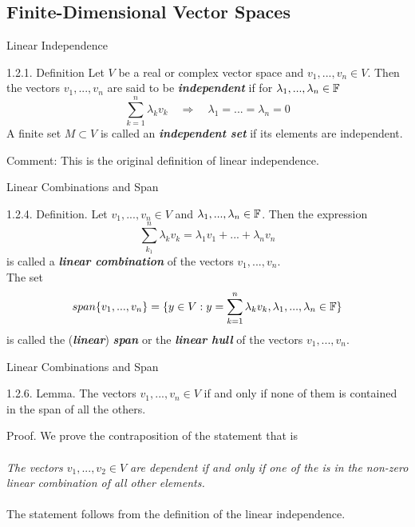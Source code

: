 \documentclass[hyperref={pdfpagelabels=true}]{beamer}
\newcommand{\highlightg}[1]{\textcolor[rgb]{0.1,0.5,0.3}{\emph{\textbf{#1}}}}
\newcommand{\<}{\langle}
\renewcommand{\>}{\rangle}
\begin{document}
\subsection{Finite-Dimensional Vector Spaces}
\begin{frame}{Linear Independence}
    \begin{block}{1.2.1. Definition}
        Let $V$ be a real or complex vector space and $v_1,...,v_n \in V$. Then the vectors $v_1,...,v_n$ are said to be \highlightg{independent} if for $\lambda_{1},...,\lambda_{n} \in \mathbb{F}$
        \[\sum_{k = 1}^{n}\lambda_{k}v_{k} \quad \Rightarrow \quad \lambda_1 = ... = \lambda_{n} = 0\]
        A finite set $M \subset V$ is called an \highlightg{independent set} if its elements are independent.
    \end{block}
    \begin{block}{Comment:}
        This is the original definition of linear independence.
    \end{block}
\end{frame}
\begin{frame}{Linear Combinations and Span}
    \begin{block}{1.2.4. Definition.}
        Let $v_1,...,v_n \in V$ and $\lambda_1,...,\lambda_n \in \mathbb{F}$. Then the expression
        \[\sum_{k_1}^{n} \lambda_{k}v_{k} = \lambda_1v_1+...+\lambda_{n}v_{n}\]
        is called a \highlightg{linear combination} of the vectors $v_{1},...,v_{n}$.\\
        The set
        \[span\{v_1,...,v_{n}\} = \{y \in V: y = \sum_{k = 1}^{n} \lambda_{k}v_{k}, \lambda_1,...,\lambda_{n} \in \mathbb{F}\}\]
        is called the (\highlightg{linear}) \highlightg{span} or the \highlightg{linear hull} of the vectors $v_1,...,v_{n}$.
    \end{block}
\end{frame}
\begin{frame}{Linear Combinations and Span}
    \begin{block}{1.2.6. Lemma.}
        The vectors $v_1,...,v_n \in V$ if and only if none of them is contained in the span of all the others.
    \end{block}
    \begin{block}{Proof.}
        We prove the contraposition of the statement that is\\
        ~\\
        \textit{The vectors $v_1,...,v_2 \in V$ are dependent if and only if one of the is in the non-zero linear combination of all other elements.}\\
        ~\\
        The statement follows from the definition of the linear independence.
    \end{block}
\end{frame}
\end{document}
